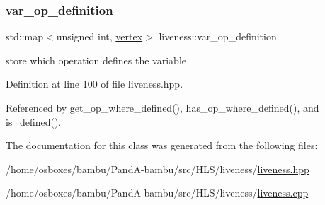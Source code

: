 \subsubsection{\texorpdfstring{var\+\_\+op\+\_\+definition}{var\_op\_definition}}
{\footnotesize\ttfamily std\+::map$<$unsigned int, \hyperlink{graph_8hpp_abefdcf0544e601805af44eca032cca14}{vertex}$>$ liveness\+::var\+\_\+op\+\_\+definition\hspace{0.3cm}{\ttfamily [private]}}



store which operation defines the variable 



Definition at line 100 of file liveness.\+hpp.



Referenced by get\+\_\+op\+\_\+where\+\_\+defined(), has\+\_\+op\+\_\+where\+\_\+defined(), and is\+\_\+defined().



The documentation for this class was generated from the following files\+:\begin{DoxyCompactItemize}
\item 
/home/osboxes/bambu/\+Pand\+A-\/bambu/src/\+H\+L\+S/liveness/\hyperlink{liveness_8hpp}{liveness.\+hpp}\item 
/home/osboxes/bambu/\+Pand\+A-\/bambu/src/\+H\+L\+S/liveness/\hyperlink{liveness_8cpp}{liveness.\+cpp}\end{DoxyCompactItemize}
